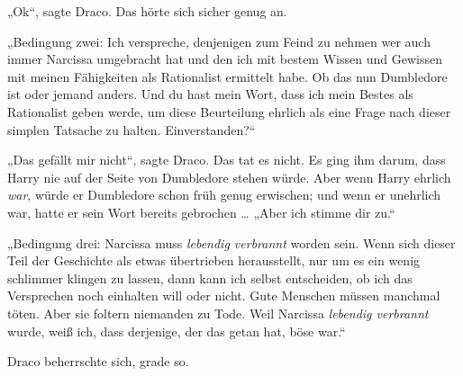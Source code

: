 „Ok“, sagte Draco. Das hörte sich sicher genug an.

„Bedingung zwei: Ich verspreche, denjenigen zum Feind zu nehmen wer auch immer Narcissa umgebracht hat und den ich mit bestem Wissen und Gewissen mit meinen Fähigkeiten als Rationalist ermittelt habe. Ob das nun Dumbledore ist oder jemand anders. Und du hast mein Wort, dass ich mein Bestes als Rationalist geben werde, um diese Beurteilung ehrlich als eine Frage nach dieser simplen Tatsache zu halten. Einverstanden?“

„Das gefällt mir nicht“, sagte Draco. Das tat es nicht. Es ging ihm darum, dass Harry nie auf der Seite von Dumbledore stehen würde. Aber wenn Harry ehrlich \emph{war}, würde er Dumbledore schon früh genug erwischen; und wenn er unehrlich war, hatte er sein Wort bereits gebrochen …
„Aber ich stimme dir zu.“

„Bedingung drei: Narcissa muss \emph{lebendig verbrannt} worden sein. Wenn sich dieser Teil der Geschichte als etwas übertrieben herausstellt, nur um es ein wenig schlimmer klingen zu lassen, dann kann ich selbst entscheiden, ob ich das Versprechen noch einhalten will oder nicht. Gute Menschen müssen manchmal töten. Aber sie foltern niemanden zu Tode. Weil Narcissa \emph{lebendig verbrannt} wurde, weiß ich, dass derjenige, der das getan hat, böse war.“

Draco beherrschte sich, grade so.

